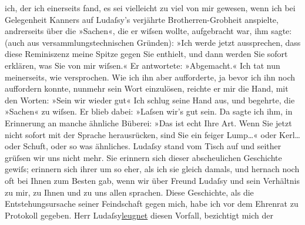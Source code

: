 \begin{ledgroupsized}[t]{13cm}
               ich, der ich einerseits fand, es sei vielleicht zu viel von mir gewesen, wenn ich bei
               Gelegenheit Kanners auf Ludaſsy’s verjährte Brotherren-Grobheit anspielte, andrerseits
               über die »Sachen«, die er wiſsen wollte, aufgebracht war, ihm sagte: (auch aus
               versammlungstechnischen Gründen): »Ich werde jetzt aussprechen, dass diese
               Reminiszenz meine Spitze gegen Sie enthielt, und dann werden Sie sofort erklären, was
               Sie von mir wiſsen.« Er antwortete: »Abgemacht.« Ich tat nun meinerseits, wie
               versprochen. Wie ich ihn aber aufforderte, ja bevor ich ihn noch auffordern konnte,
               nunmehr sein Wort einzulösen, reichte er mir die Hand, mit den Worten: »Sein wir
               wieder gut{\dotstwo}« Ich schlug seine Hand aus, und begehrte, die
               »Sachen« zu wiſsen. Er blieb dabei: »Laſsen wir’s gut sein. Da sagte ich ihm, in
               Erinnerung an manche ähnliche Büberei: »Das ist echt Ihre Art. Wenn Sie jetzt nicht
               sofort mit {\pb}der Sprache
               herausrücken, sind Sie ein feiger Lump{\dots}« oder Kerl{\dots} oder Schuft, oder so was ähnliches. Ludaſsy stand vom Tisch auf und seither grüſsen wir uns nicht
               mehr. \pend
           \pstart
           Sie erinnern sich dieser abscheulichen Geschichte gewiſs; erinnern sich ihrer um so
               eher, als ich sie gleich damals, und hernach noch oft bei Ihnen zum Besten gab, wenn
               wir über Freund Ludaſsy und sein Verhältnis zu
               mir, zu Ihnen und zu uns allen sprachen. \pend
           \pstart
           Diese Geschichte, als die Entstehungsursache seiner Feindschaft gegen mich, habe ich
               vor dem Ehrenrat zu Protokoll gegeben. Herr Ludaſsy\uline{leugnet} diesen Vorfall, bezichtigt mich der

\end{ledgroupsized}
